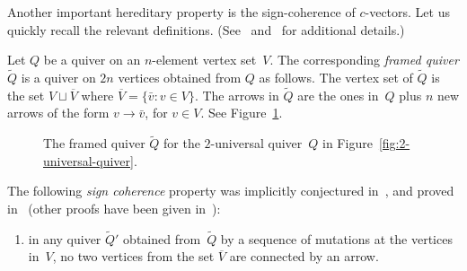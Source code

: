 
Another important %
hereditary property is the sign-coherence of $c$-vectors. 
Let us quickly recall the relevant definitions. 
(See~\cite{nakanishi-zelevinsky} and~\cite{ca4, keller-fpsac13} for additional details.)

\begin{definition}
Let $Q$ be a quiver on an $n$-element vertex set~$V$. 
The corresponding \emph{framed quiver} $\widetilde Q$ is a quiver on $2n$ vertices
obtained from $Q$ as follows. 
The vertex set of $\widetilde Q$ is the set $V\sqcup \overline V$ where 
$\overline V=\{\bar v:v\in V\}$. The arrows in $\widetilde Q$ are the ones in~$Q$ plus 
$n$ new arrows of the form $v\to \bar v$, for $v\in V$. 
See Figure~\ref{fig:2-universal-quiver-framed}. 
\end{definition}

\begin{figure}[ht]\centering

\caption{The framed quiver $\widetilde Q$ for the $2$-universal quiver~$Q$ in Figure~\ref{fig:2-universal-quiver}. }
\label{fig:2-universal-quiver-framed}
\end{figure}


The following \emph{sign coherence} property was implicitly conjectured in~\cite{ca4}, and proved in~\cite{DWZ2}
(other proofs have been given in~\cite{GHKK, Nagao}):
\begin{enumerate}[label=(SC)]
\item\label{SC} %
in any quiver $\widetilde Q'$ obtained from~$\widetilde Q$ by a sequence of mutations
at the vertices in~$V$, 
no two vertices from the set $\overline V$ are connected by an arrow. 
\end{enumerate}

